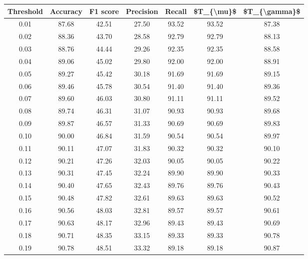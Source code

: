 \begin{tabular}{|c|c|c|c|c|c|c|}
\hline
 Threshold &  Accuracy &  F1 score &  Precision &  Recall &  \$T\_\{\textbackslash mu\}\$ &  \$T\_\{\textbackslash gamma\}\$ \\
\hline
      0.01 &     87.68 &     42.51 &      27.50 &   93.52 &      93.52 &         87.38 \\
      0.02 &     88.36 &     43.70 &      28.58 &   92.79 &      92.79 &         88.13 \\
      0.03 &     88.76 &     44.44 &      29.26 &   92.35 &      92.35 &         88.58 \\
      0.04 &     89.06 &     45.02 &      29.80 &   92.00 &      92.00 &         88.91 \\
      0.05 &     89.27 &     45.42 &      30.18 &   91.69 &      91.69 &         89.15 \\
      0.06 &     89.46 &     45.78 &      30.54 &   91.40 &      91.40 &         89.36 \\
      0.07 &     89.60 &     46.03 &      30.80 &   91.11 &      91.11 &         89.52 \\
      0.08 &     89.74 &     46.31 &      31.07 &   90.93 &      90.93 &         89.68 \\
      0.09 &     89.87 &     46.57 &      31.33 &   90.69 &      90.69 &         89.83 \\
      0.10 &     90.00 &     46.84 &      31.59 &   90.54 &      90.54 &         89.97 \\
      0.11 &     90.11 &     47.07 &      31.83 &   90.32 &      90.32 &         90.10 \\
      0.12 &     90.21 &     47.26 &      32.03 &   90.05 &      90.05 &         90.22 \\
      0.13 &     90.31 &     47.45 &      32.24 &   89.90 &      89.90 &         90.33 \\
      0.14 &     90.40 &     47.65 &      32.43 &   89.76 &      89.76 &         90.43 \\
      0.15 &     90.48 &     47.82 &      32.61 &   89.63 &      89.63 &         90.52 \\
      0.16 &     90.56 &     48.03 &      32.81 &   89.57 &      89.57 &         90.61 \\
      0.17 &     90.63 &     48.17 &      32.96 &   89.43 &      89.43 &         90.69 \\
      0.18 &     90.71 &     48.35 &      33.15 &   89.33 &      89.33 &         90.78 \\
      0.19 &     90.78 &     48.51 &      33.32 &   89.18 &      89.18 &         90.87 \\

\end{tabular}
